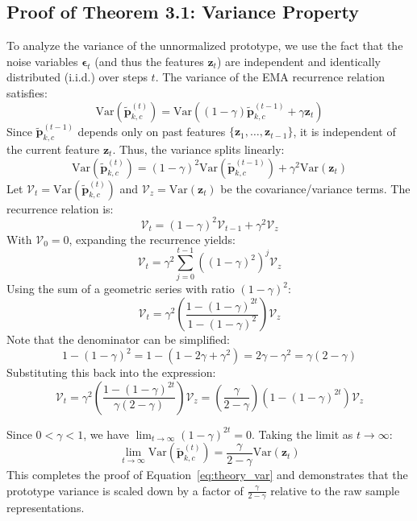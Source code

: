 \documentclass{article}
\theoremstyle{plain}
\theoremstyle{definition}
\theoremstyle{remark}
\begin{document}
\subsection{Proof of Theorem 3.1: Variance Property}
To analyze the variance of the unnormalized prototype, we use the fact that the noise variables $\boldsymbol{\epsilon}_t$ (and thus the features $\boldsymbol{z}_t$) are independent and identically distributed (i.i.d.) over steps $t$. The variance of the EMA recurrence relation satisfies:
\begin{equation}
    \text{Var}(\tilde{\boldsymbol{p}}_{k,c}^{(t)}) = \text{Var}\left( (1 - \gamma) \tilde{\boldsymbol{p}}_{k,c}^{(t-1)} + \gamma \boldsymbol{z}_t \right)
\end{equation}
Since $\tilde{\boldsymbol{p}}_{k,c}^{(t-1)}$ depends only on past features $\{\boldsymbol{z}_1, \dots, \boldsymbol{z}_{t-1}\}$, it is independent of the current feature $\boldsymbol{z}_t$. Thus, the variance splits linearly:
\begin{equation}
    \text{Var}(\tilde{\boldsymbol{p}}_{k,c}^{(t)}) = (1 - \gamma)^2 \text{Var}(\tilde{\boldsymbol{p}}_{k,c}^{(t-1)}) + \gamma^2 \text{Var}(\boldsymbol{z}_t)
\end{equation}
Let $\mathcal{V}_t = \text{Var}(\tilde{\boldsymbol{p}}_{k,c}^{(t)})$ and $\mathcal{V}_z = \text{Var}(\boldsymbol{z}_t)$ be the covariance/variance terms. The recurrence relation is:
\begin{equation}
    \mathcal{V}_t = (1 - \gamma)^2 \mathcal{V}_{t-1} + \gamma^2 \mathcal{V}_z
\end{equation}
With $\mathcal{V}_0 = 0$, expanding the recurrence yields:
\begin{equation}
    \mathcal{V}_t = \gamma^2 \sum_{j=0}^{t-1} \left( (1-\gamma)^2 \right)^j \mathcal{V}_z
\end{equation}
Using the sum of a geometric series with ratio $(1-\gamma)^2$:
\begin{equation}
    \mathcal{V}_t = \gamma^2 \left( \frac{1 - (1-\gamma)^{2t}}{1 - (1-\gamma)^2} \right) \mathcal{V}_z
\end{equation}
Note that the denominator can be simplified:
\begin{equation}
    1 - (1-\gamma)^2 = 1 - (1 - 2\gamma + \gamma^2) = 2\gamma - \gamma^2 = \gamma (2 - \gamma)
\end{equation}
Substituting this back into the expression:
\begin{equation}
    \mathcal{V}_t = \gamma^2 \left( \frac{1 - (1-\gamma)^{2t}}{\gamma (2 - \gamma)} \right) \mathcal{V}_z = \left( \frac{\gamma}{2 - \gamma} \right) \left( 1 - (1-\gamma)^{2t} \right) \mathcal{V}_z
\end{equation}

Since $0 < \gamma < 1$, we have $\lim_{t \to \infty} (1-\gamma)^{2t} = 0$. Taking the limit as $t \to \infty$:
\begin{equation}
    \lim_{t \to \infty} \text{Var}(\tilde{\boldsymbol{p}}_{k,c}^{(t)}) = \frac{\gamma}{2 - \gamma} \text{Var}(\boldsymbol{z}_t)
\end{equation}
This completes the proof of Equation~\eqref{eq:theory_var} and demonstrates that the prototype variance is scaled down by a factor of $\frac{\gamma}{2-\gamma}$ relative to the raw sample representations.
\end{document}

